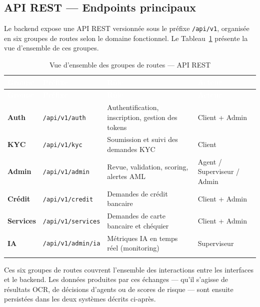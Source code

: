 \subsection{API REST --- Endpoints principaux}
\label{subsec:api-rest}

Le backend expose une API REST versionnée sous le préfixe \texttt{/api/v1}, organisée en six groupes de routes selon le domaine fonctionnel. Le Tableau~\ref{tab:api-routes} présente la vue d'ensemble de ces groupes.

\renewcommand{\arraystretch}{1.3}
\begin{longtable}{|p{2cm}|p{4cm}|p{6cm}|p{3cm}|}
  \rowcolor{bleu_principal}
  \textcolor{white}{\textbf{Groupe}} & \textcolor{white}{\textbf{Préfixe}} & \textcolor{white}{\textbf{Rôle}} & \textcolor{white}{\textbf{Acteur}} \\
  \hline
  \endfirsthead
  \rowcolor{bleu_principal}
  \textcolor{white}{\textbf{Groupe}} & \textcolor{white}{\textbf{Préfixe}} & \textcolor{white}{\textbf{Rôle}} & \textcolor{white}{\textbf{Acteur}} \\
  \hline
  \endhead
  \textbf{Auth}     & \texttt{/api/v1/auth}     & Authentification, inscription, gestion des tokens & Client + Admin \\
  \hline
  \textbf{KYC}      & \texttt{/api/v1/kyc}      & Soumission et suivi des demandes KYC              & Client \\
  \hline
  \textbf{Admin}    & \texttt{/api/v1/admin}    & Revue, validation, scoring, alertes AML           & Agent / Superviseur / Admin \\
  \hline
  \textbf{Crédit}   & \texttt{/api/v1/credit}   & Demandes de crédit bancaire                       & Client + Admin \\
  \hline
  \textbf{Services} & \texttt{/api/v1/services} & Demandes de carte bancaire et chéquier            & Client + Admin \\
  \hline
  \textbf{IA}       & \texttt{/api/v1/admin/ia} & Métriques IA en temps réel (monitoring)           & Superviseur \\
  \hline
  \caption{Vue d'ensemble des groupes de routes --- API REST}
  \label{tab:api-routes}
\end{longtable}

Ces six groupes de routes couvrent l'ensemble des interactions entre les interfaces et le backend. Les données produites par ces échanges — qu'il s'agisse de résultats OCR, de décisions d'agents ou de scores de risque — sont ensuite persistées dans les deux systèmes décrits ci-après.

